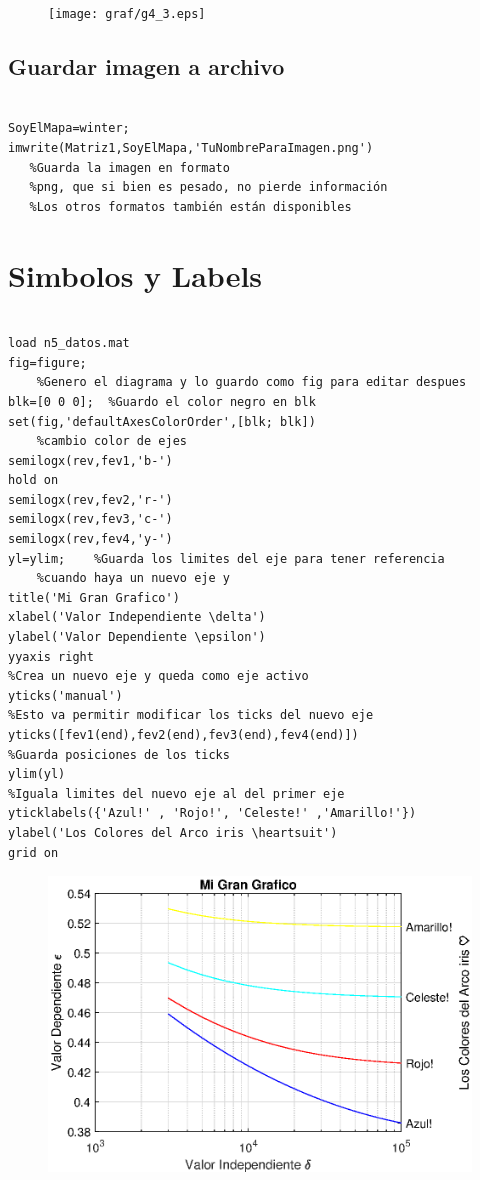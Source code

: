 \documentclass[11pt, a4paper,titlepage]{article}
\begin{document}
\begin{figure}[h]
\centering
\texttt{[image: graf/g4\_3.eps]}
\end{figure}
\subsection{Guardar imagen a archivo}
\begin{code}
\begin{verbatim}

SoyElMapa=winter;
imwrite(Matriz1,SoyElMapa,'TuNombreParaImagen.png') 
   %Guarda la imagen en formato
   %png, que si bien es pesado, no pierde información
   %Los otros formatos también están disponibles
\end{verbatim}
\end{code}
\clearpage
\section{Simbolos y Labels}
\begin{code}
\begin{verbatim}

load n5_datos.mat
fig=figure;   
    %Genero el diagrama y lo guardo como fig para editar despues
blk=[0 0 0];  %Guardo el color negro en blk
set(fig,'defaultAxesColorOrder',[blk; blk])
    %cambio color de ejes
semilogx(rev,fev1,'b-')
hold on            
semilogx(rev,fev2,'r-')
semilogx(rev,fev3,'c-') 
semilogx(rev,fev4,'y-')
yl=ylim;    %Guarda los limites del eje para tener referencia
    %cuando haya un nuevo eje y
title('Mi Gran Grafico')
xlabel('Valor Independiente \delta')
ylabel('Valor Dependiente \epsilon')
yyaxis right      
%Crea un nuevo eje y queda como eje activo
yticks('manual')  
%Esto va permitir modificar los ticks del nuevo eje
yticks([fev1(end),fev2(end),fev3(end),fev4(end)]) 
%Guarda posiciones de los ticks
ylim(yl)                
%Iguala limites del nuevo eje al del primer eje
yticklabels({'Azul!' , 'Rojo!', 'Celeste!' ,'Amarillo!'})
ylabel('Los Colores del Arco iris \heartsuit')
grid on
\end{verbatim}
\end{code}
\clearpage
\begin{figure}[h]
\centering
\includegraphics[width=\textwidth]{graf/g5_rev.eps}
\end{figure}
\end{document}
